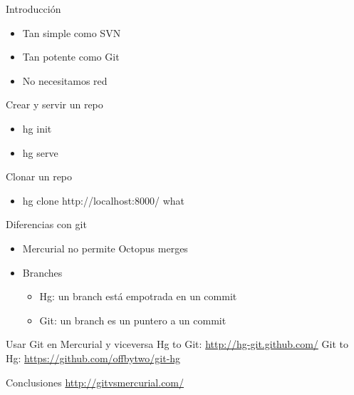 \documentclass[spanish]{beamer}
\begin{document}
        \begin{frame}{Introducción}
            \begin{itemize}
                \item Tan simple como SVN
                \item Tan potente como Git
                \item No necesitamos red
            \end{itemize}
        \end{frame}
        
        
        \begin{frame}{Crear y servir un repo}
            \begin{itemize}
                \item hg init
                \item hg serve
            \end{itemize}
        \end{frame}
        
        
        \begin{frame}{Clonar un repo}
            \begin{itemize}
                \item hg clone http://localhost:8000/ what      
            \end{itemize}
        \end{frame}
        
        
        \begin{frame}{Diferencias con git}
            \begin{itemize}
                \item Mercurial no permite Octopus merges
                \item Branches
                \begin{itemize}
                    \item Hg: un branch está empotrada en un commit
                    \item Git: un branch es un puntero a un commit
                \end{itemize}
                
            \end{itemize}
        \end{frame}
        
        
        
               
        \begin{frame}{Usar Git en Mercurial y viceversa} 
        Hg to Git: \url{http://hg-git.github.com/}
        Git to Hg: \url{https://github.com/offbytwo/git-hg}
        \end{frame}
	\begin{frame}{Conclusiones}
          \url{http://gitvsmercurial.com/}
        \end{frame}
       
\end{document}
